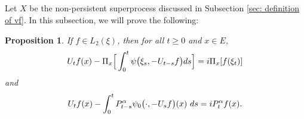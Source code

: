 \documentclass[12pt,a4paper]{amsart}
\theoremstyle{plain}
\newtheorem{prop}[thm]{Proposition}
\theoremstyle{definition}
\numberwithin{equation}{section}
\begin{document}
\subsection{}
    Let $X$ be the non-persistent superprocess discussed in Subsection \ref{sec: definition of vf}.
    In this subsection, we will prove the following:
    \begin{prop}
\label{prop: complex FKPP-equation}
    If $f\in L_2(\xi)$,  then for all $t\geq 0$ and $x\in E$,
\begin{equation}
\label{eq: complex FKPP-equation}
    U_tf(x) - \Pi_x \Big[\int_0^t \psi\big(\xi_s, - U_{t-s}f\big) ds \Big]
    \\= i \Pi_x [f(\xi_t)]
\end{equation}
and
\begin{equation}
\label{eq: complex FKPP-equation with FK-transform}
    U_tf(x) -  \int_0^t P_{t-s}^{\alpha} \psi_0\big(\cdot,-U_sf\big) (x)~ds
      \\= iP_t^\alpha f(x).
\end{equation}
\end{prop}
\end{document}
